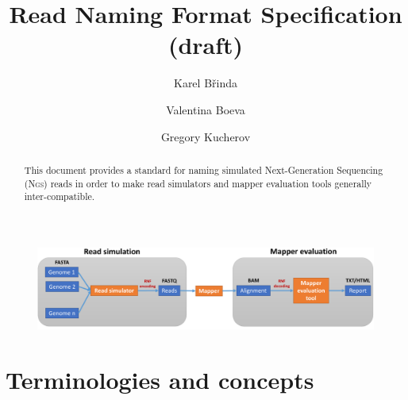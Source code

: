 \documentclass[10pt,a4paper]{article}
\title{Read Naming Format Specification (draft)}
\author{Karel Břinda \and Valentina Boeva \and Gregory Kucherov}
\newcommand{\RNF}{\textsc{Rnf}}
\newcommand{\NGS}{\textsc{Ngs}}
\begin{document}
\maketitle


\begin{abstract}
	This document provides a standard for
	naming simulated Next-Generation Sequencing (\NGS) reads
	in order to make read simulators and mapper evaluation tools generally inter-compatible.
\end{abstract}


\bigskip

\begin{figure}[h]
\includegraphics[width=\textwidth]{evaluation_rnf_cropped.pdf}
\end{figure}



\section{Terminologies and concepts}
\end{document}
